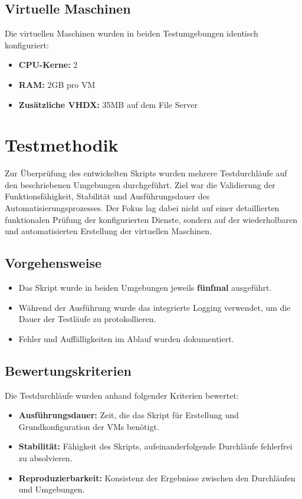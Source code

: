 \documentclass[conference]{IEEEtran}
\begin{document}
\section{Virtuelle Maschinen}

Die virtuellen Maschinen wurden in beiden Testumgebungen identisch konfiguriert:

\begin{itemize}
\item \textbf{CPU-Kerne:} 2
\item \textbf{RAM:} 2GB pro VM
\item \textbf{Zusätzliche VHDX:} 35MB auf dem File Server
\end{itemize}

\chapter{Testmethodik}

Zur Überprüfung des entwickelten Skripts wurden mehrere Testdurchläufe auf den beschriebenen Umgebungen durchgeführt. Ziel war die Validierung der Funktionsfähigkeit, Stabilität und Ausführungsdauer des Automatisierungsprozesses. Der Fokus lag dabei nicht auf einer detaillierten funktionalen Prüfung der konfigurierten Dienste, sondern auf der wiederholbaren und automatisierten Erstellung der virtuellen Maschinen.

\section{Vorgehensweise}

\begin{itemize}
\item Das Skript wurde in beiden Umgebungen jeweils \textbf{fünfmal} ausgeführt.
\item Während der Ausführung wurde das integrierte Logging verwendet, um die Dauer der Testläufe zu protokollieren.
\item Fehler und Auffälligkeiten im Ablauf wurden dokumentiert.
\end{itemize}

\section{Bewertungskriterien}

Die Testdurchläufe wurden anhand folgender Kriterien bewertet:

\begin{itemize}
\item \textbf{Ausführungsdauer:} Zeit, die das Skript für Erstellung und Grundkonfiguration der VMs benötigt.
\item \textbf{Stabilität:} Fähigkeit des Skripts, aufeinanderfolgende Durchläufe fehlerfrei zu absolvieren.
\item \textbf{Reproduzierbarkeit:} Konsistenz der Ergebnisse zwischen den Durchläufen und Umgebungen.
\end{itemize}
\end{document}
